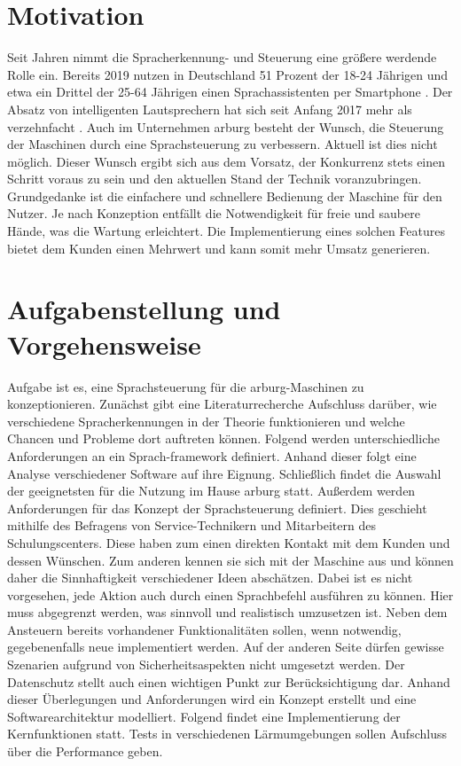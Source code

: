 \section{Motivation}
\label{motivation}
Seit Jahren nimmt die Spracherkennung- und Steuerung eine größere werdende Rolle ein. Bereits 2019 nutzen in Deutschland 51 Prozent der 18-24 Jährigen und etwa ein Drittel der 25-64 Jährigen einen Sprachassistenten per Smartphone \cite{Sprachassisten.2019}. Der Absatz von intelligenten Lautsprechern hat sich seit Anfang 2017 mehr als verzehnfacht \cite{SmarteLautsprecher.2021}. Auch im Unternehmen \gls{arburg} besteht der Wunsch, die Steuerung der Maschinen durch eine Sprachsteuerung zu verbessern. Aktuell ist dies nicht möglich. Dieser Wunsch ergibt sich aus dem Vorsatz, der Konkurrenz stets einen Schritt voraus zu sein und den aktuellen Stand der Technik voranzubringen. Grundgedanke ist die einfachere und schnellere Bedienung der Maschine für den Nutzer. Je nach Konzeption entfällt die Notwendigkeit für freie und saubere Hände, was die Wartung erleichtert. Die Implementierung eines solchen Features bietet dem Kunden einen Mehrwert und kann somit mehr Umsatz generieren. 

\section{Aufgabenstellung und Vorgehensweise}
\label{sec:aufgabevorgehen}
Aufgabe ist es, eine Sprachsteuerung für die \gls{arburg}-Maschinen zu konzeptionieren. Zunächst gibt eine Literaturrecherche Aufschluss darüber, wie verschiedene Spracherkennungen in der Theorie funktionieren und welche Chancen und Probleme dort auftreten können. Folgend werden unterschiedliche Anforderungen an ein Sprach-\gls{framework} definiert. Anhand dieser folgt eine Analyse verschiedener Software auf ihre Eignung. Schließlich findet die Auswahl der geeignetsten für die Nutzung im Hause \gls{arburg} statt. Außerdem werden Anforderungen für das Konzept der Sprachsteuerung definiert. Dies geschieht mithilfe des Befragens von Service-Technikern und Mitarbeitern des Schulungscenters. Diese haben zum einen direkten Kontakt mit dem Kunden und dessen Wünschen. Zum anderen kennen sie sich mit der Maschine aus und können daher die Sinnhaftigkeit verschiedener Ideen abschätzen. Dabei ist es nicht vorgesehen, jede Aktion auch durch einen Sprachbefehl ausführen zu können. Hier muss abgegrenzt werden, was sinnvoll und realistisch umzusetzen ist. Neben dem Ansteuern bereits vorhandener Funktionalitäten sollen, wenn notwendig, gegebenenfalls neue implementiert werden. Auf der anderen Seite dürfen gewisse Szenarien aufgrund von Sicherheitsaspekten nicht umgesetzt werden. Der Datenschutz stellt auch einen wichtigen Punkt zur Berücksichtigung dar. Anhand dieser Überlegungen und Anforderungen wird ein Konzept erstellt und eine Softwarearchitektur modelliert. Folgend findet eine Implementierung der Kernfunktionen statt. Tests in verschiedenen Lärmumgebungen sollen Aufschluss über die Performance geben.

